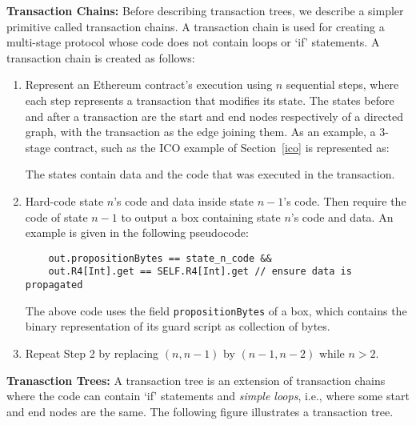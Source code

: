 \documentclass[runningheads]{llncs}
\newcommand{\node}{\mathsf{t}}
\begin{document}
\textbf{Transaction Chains:} Before describing transaction trees, we describe a simpler primitive called transaction chains. A transaction chain is used for creating a multi-stage protocol whose code does not contain loops or `if' statements. A transaction chain is created as follows:
\begin{enumerate}
	\item Represent an Ethereum contract's execution using $n$ sequential steps, where each step represents a transaction that modifies its state.
The states before and after a transaction are the start and end nodes respectively of a directed graph, with the transaction as the edge joining them. 
	As an example, a 3-stage contract, such as the ICO example of Section~\ref{ico} is represented as:
	
	
	The states contain data and the code that was executed in the transaction.
	\item Hard-code state $n$'s code and data inside state $n-1$'s code. Then require the code of state $n-1$ to output a box containing state $n$'s code and data. An example is given in the following pseudocode:
	\begin{verbatim}
	out.propositionBytes == state_n_code &&  
	out.R4[Int].get == SELF.R4[Int].get // ensure data is propagated
	\end{verbatim}
	
	The above code uses the field \texttt{propositionBytes} of a box, which contains the binary representation of its guard script as collection of bytes.
	
	
	\item Repeat Step 2 by replacing $(n, n-1)$ by $(n-1, n-2)$ while $n > 2$.
\end{enumerate}

\textbf{Tranasction Trees:} A transaction tree is an extension of transaction chains where the code can contain `if' statements and {\em simple loops}, i.e., where some start and end nodes are the same. The following figure illustrates a transaction tree.
\end{document}
